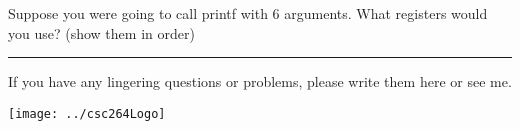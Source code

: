 \documentclass[letterpaper,12pt]{exam}
\begin{document}
\begin{questions}
\begin{samepage}
    \question Suppose you were going to call printf with 6 arguments.  What registers would you use?  (show them in order)
    \vspace{15mm}
\end{samepage}
\par





\end{questions} 
\begin{center}
    \rule{0.667\textwidth}{.8pt} %
\end{center}


If you have any lingering questions or problems, please write them here or see me.
\vfill
\begin{center}
\texttt{[image: ../csc264Logo]}
\end{center}
\end{document}
